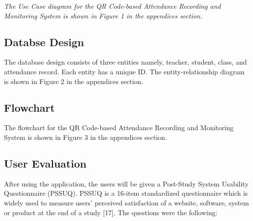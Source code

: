 \documentclass[journal]{./IEEE/IEEEtran}
\begin{document}
\newline
\textit{The Use Case diagram for the QR Code-based Attendance Recording and Monitoring System is shown in Figure 1 in the appendices section.}



\subsection{Databse Design}
The database design consists of three entities namely, teacher, student, class, and attendance record. Each entity has a unique ID. The entity-relationship diagram is shown in Figure 2 in the appendices section.




\subsection{Flowchart}
The flowchart for the QR Code-based Attendance Recording and Monitoring System is shown in Figure 3 in the appendices section.
\newline


\subsection{User Evaluation}
After using the application, the users will be given a Post-Study System Usability Questionnaire (PSSUQ).  PSSUQ is a 16-item standardized questionnaire which is widely used to measure users’ perceived satisfaction of a website, software, system or product at the end of a study [17]. The questions were the following:
\end{document}
